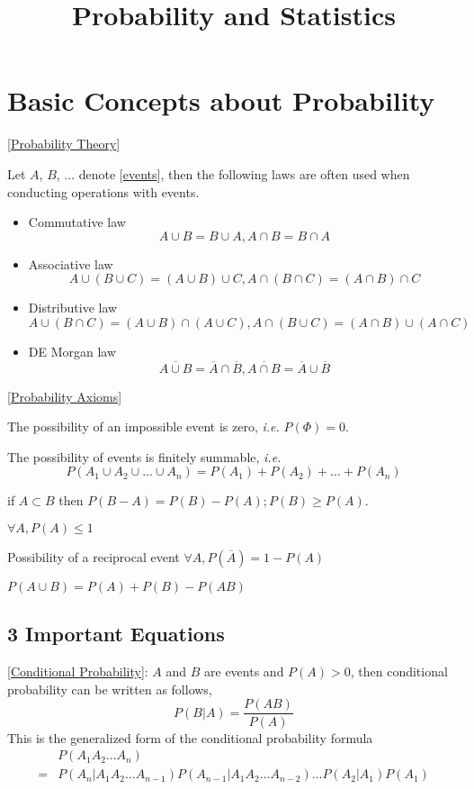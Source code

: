 \title{Probability and Statistics}

\section{Basic Concepts about Probability}

[\href{https://en.wikipedia.org/wiki/Probability_theory}{Probability Theory}]

Let $A$, $B$, $\ldots$ denote
[\href{https://en.wikipedia.org/wiki/Event_(probability_theory)}{events}],
then the following laws are often used when conducting operations with events.

\begin{itemize}
	\item Commutative law\\
$$ A\cup B=B\cup A, A\cap B=B\cap A $$
	\item Associative law\\
$$ A\cup(B\cup C)=(A\cup B)\cup C, A\cap(B\cap C)=(A\cap B)\cap C $$
	\item Distributive law\\
$$ A\cup(B\cap C)=(A\cup B)\cap(A\cup C), A\cap(B\cup C)=(A\cap B)\cup(A\cap C) $$
	\item DE Morgan law\\
$$ \overline{A\cup B}=\overline{A}\cap\overline{B}, \overline{A\cap B}=\overline{A}\cup\overline{B} $$
\end{itemize}

[\href{https://en.wikipedia.org/wiki/Probability_axioms}{Probability Axioms}]

The possibility of an impossible event is zero, {\it i.e.}
$ P(\Phi) = 0 $.

The possibility of events is finitely summable, {\it i.e.}
$$ P(A_1 \cup A_2 \cup \ldots \cup A_n) = 
   P(A_1) + P(A_2) + \ldots + P(A_n) $$

if $A \subset B$ then $P(B-A) = P(B)-P(A); P(B)\geq P(A)$.

$\forall A, P(A) \leqslant 1$

Possibility of a reciprocal event $\forall A, P(\overline{A}) = 1-P(A)$

$P(A\cup B) = P(A) + P(B) - P(AB)$

\subsection{3 Important Equations}

[\href{https://en.wikipedia.org/wiki/Conditional_probability}{Conditional Probability}]:
$A$ and $B$ are events and $P(A)>0$, then conditional probability can be
written as follows,
$$ P(B|A) = \frac{P(AB)}{P(A)} $$
This is the generalized form of the conditional probability formula
\begin{align}
	& P(A_1A_2\ldots A_n)\\
	=& P(A_n|A_1A_2\ldots A_{n-1})P(A_{n-1}|A_1A_2\ldots A_{n-2})\ldots P(A_2|A_1)P(A_1)
\end{align}

